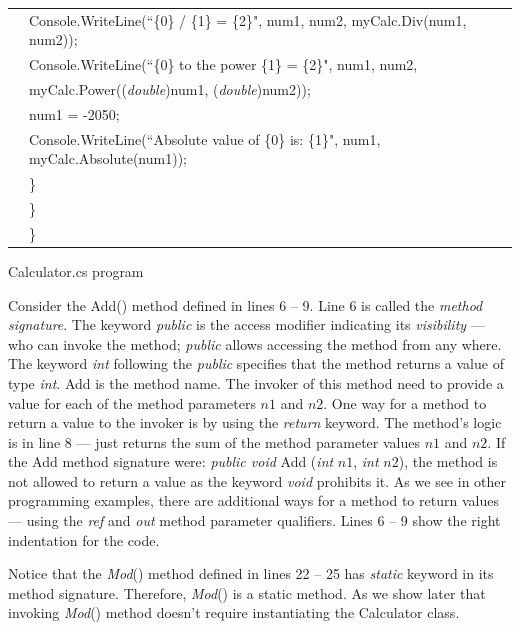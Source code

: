 \begin{program}
\begin{tabular}{>{\codelinenumfont}l>{\codelistingfont}l}
53 &  \hspace{0.6in} Console.WriteLine(``\{0\} / \{1\} = \{2\}", num1, num2, myCalc.Div(num1, num2)); \\
54 &  \hspace{0.6in} Console.WriteLine(``\{0\} to the power \{1\} = \{2\}",  num1, num2, \\
& \hspace{1in} myCalc.Power((\emph{double})num1, (\emph{double})num2)); \\
55 &  \hspace{0.6in} num1 = -2050; \\
56 &  \hspace{0.6in} Console.WriteLine(``Absolute value of \{0\} is: \{1\}", num1, myCalc.Absolute(num1)); \\
57 & \hspace{0.4in} \} \\
58 & \hspace{0.2in} \} \\
59 & \} \\


\end{tabular}
\caption{Calculator.cs program} \label{tab:Calculator1}
\end{program}
\renewcommand{\baselinestretch}{1.0}



Consider the Add() method defined in lines 6 -- 9. Line 6 is
called the \emph{method signature}. The keyword \emph{public} is
the access modifier indicating its \emph{visibility} --- who can
invoke the method; \emph{public} allows accessing the method from
any where. The keyword \emph{int} following the \emph{public}
specifies that the method returns a value of type \emph{int}. Add
is the method name. The invoker of this method need to provide a
value for each of the method parameters $n1$ and $n2$. One way for
a method to return a value to the invoker is by using the
\emph{return} keyword. The method's logic is in line 8 --- just
returns the sum of the method parameter values $n1$ and $n2$. If
the Add method signature were: \emph{public void} Add (\emph{int}
$n1$, \emph{int} $n2$), the method is not allowed to return a
value as the keyword \emph{void} prohibits it. As we see in other
programming examples, there are additional ways for a method to
return values --- using the \emph{ref} and \emph{out} method
parameter qualifiers. Lines 6 -- 9 show the right indentation for
the code.


Notice that the \emph{Mod}() method defined in lines 22 -- 25 has
\emph{static} keyword in its method signature. Therefore,
\emph{Mod}() is a static method. As we show later that invoking
\emph{Mod}() method doesn't require instantiating the Calculator
class.


